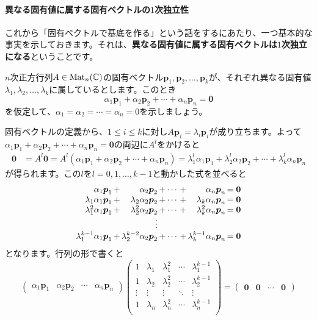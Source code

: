 \paragraph{異なる固有値に属する固有ベクトルの$1$次独立性}

これから「固有ベクトルで基底を作る」という話をするにあたり、一つ基本的な事実を示しておきます。それは、\textbf{異なる固有値に属する固有ベクトルは$1$次独立になる}ということです。

$n$次正方行列$A \in \operatorname{Mat}_n(\mathbb{C})$の固有ベクトル$\bm{p}_1, \bm{p}_2, \ldots, \bm{p}_k$が、それぞれ異なる固有値$\lambda_1, \lambda_2, \ldots, \lambda_k$に属しているとします。このとき
\[
\alpha_1 \bm{p}_1 + \alpha_2 \bm{p}_2 + \cdots + \alpha_n \bm{p}_n = \bm{0}
\]
を仮定して、$\alpha_1 = \alpha_2 = \cdots = \alpha_n = 0$を示しましょう。

固有ベクトルの定義から、$1 \leq i \leq k$に対し$A\bm{p}_i = \lambda_i \bm{p}_i$が成り立ちます。よって$\alpha_1 \bm{p}_1 + \alpha_2 \bm{p}_2 + \cdots + \alpha_n \bm{p}_n = \bm{0}$の両辺に$A^l$をかけると
\begin{align*}
\bm{0} &= A^l \bm{0} = A^l (\alpha_1 \bm{p}_1 + \alpha_2 \bm{p}_2 + \cdots + \alpha_n \bm{p}_n)
= \lambda_1^l \alpha_1 \bm{p}_1 +  \lambda_2^l \alpha_2 \bm{p}_2 + \cdots + \lambda_k^l \alpha_n \bm{p}_n
\end{align*}
が得られます。この$l$を$l = 0, 1, \ldots, k - 1$と動かした式を並べると
\begin{align*}
\begin{array}{r@{\,}c@{\,}r@{\,}c@{\,}c@{\,}c@{\,}r@{\,}c}
\alpha_1 \bm{p}_1 & + & \alpha_2 \bm{p}_2 & + & \cdots & + & \alpha_n \bm{p}_n  & = \bm{0} \\
\lambda_1 \alpha_1 \bm{p}_1 & + & \lambda_2 \alpha_2 \bm{p}_2 & + & \cdots & + & \lambda_k \alpha_n \bm{p}_n  &= \bm{0} \\
\lambda_1^2 \alpha_1 \bm{p}_1 & + & \lambda_2^2 \alpha_2 \bm{p}_2 & + & \cdots & + & \lambda_k^2 \alpha_n \bm{p}_n  &= \bm{0} \\
& & \vdots \\
\lambda_1^{k - 1} \alpha_1 \bm{p}_1 & + & \lambda_2^{k - 2} \alpha_2 \bm{p}_2 & + & \cdots & + & \lambda_k^{k - 1} \alpha_n \bm{p}_n  &= \bm{0}
\end{array}
\end{align*}
となります。行列の形で書くと
\[
\begin{pmatrix}
\alpha_1 \bm{p}_1 & \alpha_2 \bm{p}_2 & \cdots & \alpha_n \bm{p}_n
\end{pmatrix}
\begin{pmatrix}
1 & \lambda_1 & \lambda_1^2 & \cdots & \lambda_1^{k - 1} \\
1 & \lambda_2 & \lambda_2^2 & \cdots & \lambda_2^{k - 1} \\
\vdots & \vdots & \vdots & \ddots & \vdots \\
1 & \lambda_n & \lambda_n^2 & \cdots & \lambda_n^{k - 1} \\
\end{pmatrix}
=
\begin{pmatrix}
\bm{0} & \bm{0} & \cdots & \bm{0}
\end{pmatrix}
\]
